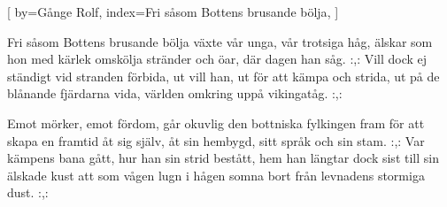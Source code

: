 

[
by={Gånge Rolf},
index={Fri såsom Bottens brusande bölja},
]

\beginverse*
Fri såsom Bottens brusande bölja
växte vår unga, vår trotsiga håg,
älskar som hon med kärlek omskölja
stränder och öar, där dagen han såg.
:,: Vill dock ej ständigt vid stranden förbida,
ut vill han, ut för att kämpa och strida,
ut på de blånande fjärdarna vida,
världen omkring uppå vikingatåg. :,:
\endverse

\beginverse* 
Emot mörker, emot fördom, går okuvlig den
bottniska fylkingen fram
för att skapa en framtid åt sig själv, 
åt sin hembygd, sitt språk och sin stam. 
:,: Var kämpens bana gått, 
hur han sin strid bestått,
hem han längtar dock sist till sin älskade kust
att som vågen lugn i hågen somna bort från
levnadens stormiga dust. :,:
\endverse
\endsong


